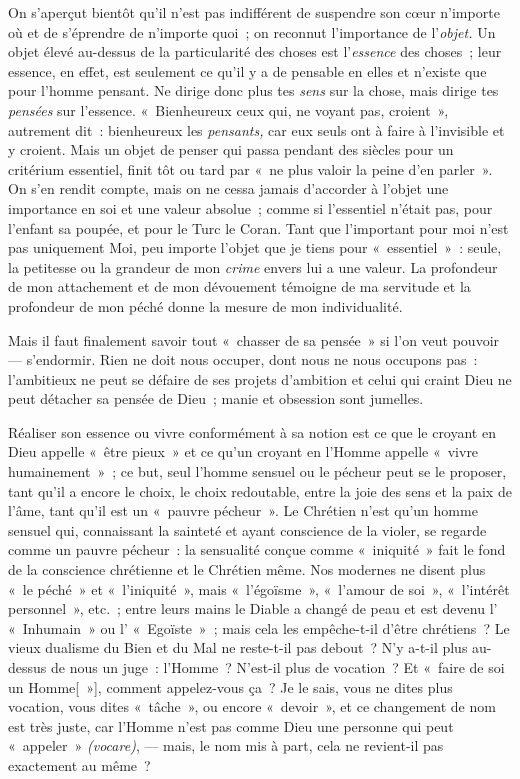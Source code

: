 \documentclass[french,twoside]{book} %
\newcommand\corr[1]{#1}
\begin{document}
On s’aperçut bientôt qu’il n’est pas indifférent de suspendre son cœur n’importe où et de s’éprendre de n’importe quoi ; on reconnut l’importance de l’\emph{objet. }Un objet élevé au-dessus de la particularité des choses est l’\emph{essence} des choses ; leur essence, en effet, est seulement ce qu’il y a de pensable en elles et n’existe que pour l’homme pensant. Ne dirige donc plus tes \emph{sens} sur la chose, mais dirige tes \emph{pensées} sur l’essence. « Bienheureux ceux qui, ne voyant pas, croient », autrement dit : bienheureux les \emph{pensants,} car eux seuls ont à faire à l’invisible et y croient. Mais un objet de penser qui passa pendant des siècles pour un critérium essentiel, finit tôt ou tard par « ne plus valoir la peine d’en parler ». On s’en rendit compte, mais on ne cessa jamais d’accorder à l’objet une importance en soi et une valeur absolue ; comme si l’essentiel n’était pas, pour l’enfant sa poupée, et pour le Turc le Coran. Tant que l’important pour moi n’est pas uniquement Moi, peu importe l’objet que je tiens pour « essentiel » : seule, la petitesse ou la grandeur de mon \emph{crime} envers lui a une valeur. La profondeur de mon attachement et de mon dévouement témoigne de ma servitude et la profondeur de mon péché donne la mesure de mon individualité.\par
Mais il faut finalement savoir tout « chasser de sa pensée » si l’on veut pouvoir — s’endormir. Rien ne doit nous occuper, dont nous ne nous occupons pas : l’ambitieux ne peut se défaire de ses projets d’ambition et celui qui craint Dieu ne peut détacher sa pensée de Dieu ; manie et obsession sont jumelles.\par
 Réaliser son essence ou vivre conformément à sa notion est ce que le croyant en Dieu appelle « être pieux » et ce qu’un croyant en l’Homme appelle « vivre humainement » ; ce but, seul l’homme sensuel ou le pécheur peut se le proposer, tant qu’il a encore le choix, le choix redoutable, entre la joie des sens et la paix de l’âme, tant qu’il est un « pauvre pécheur ». Le Chrétien n’est qu’un homme sensuel qui, connaissant la sainteté et ayant conscience de la violer, se regarde comme un pauvre pécheur : la sensualité conçue comme « iniquité » fait le fond de la conscience chrétienne et le Chrétien même. Nos modernes ne disent plus « le péché » et « l’iniquité », mais « l’égoïsme », « l’amour de soi », « l’intérêt personnel », etc. ; entre leurs mains le Diable a changé de peau et est devenu l’ « Inhumain » ou l’ « Egoïste » ; mais cela les empêche-t-il d’être chrétiens ? Le vieux dualisme du Bien et du Mal ne reste-t-il pas debout ? N’y a-t-il plus au-dessus de nous un juge : l’Homme ? N’est-il plus de vocation ? Et « faire de soi un Homme[{\corr  »}], comment appelez-vous ça ? Je le sais, vous ne dites plus vocation, vous dites « tâche », ou encore « devoir », et ce changement de nom est très juste, car l’Homme n’est pas comme Dieu une personne qui peut « appeler » \emph{(vocare)}, — mais, le nom mis à part, cela ne revient-il pas exactement au même ?\par
\end{document}
